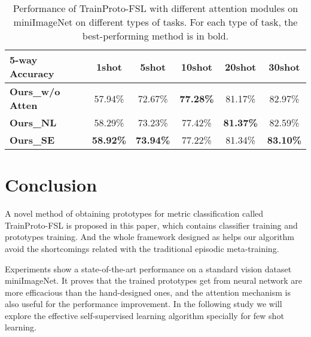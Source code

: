 \documentclass[conference]{IEEEtran}
\begin{document}
\begin{table}[htbp]
\caption{Performance of TrainProto-FSL with different attention modules on miniImageNet on different types of tasks. For each type of task, the best-performing method is in bold.}
\begin{center}
\begin{tabular}{l c c c c c}
\hline
\textbf{5-way Accuracy}&\textbf{1shot}&\textbf{5shot}&\textbf{10shot} &\textbf{20shot} &\textbf{30shot} \\
\hline
\textbf{Ours\_w/o Atten} &	57.94\%	&72.67\%	&\textbf{77.28\%}	&81.17\%	&82.97\% \\
\textbf{Ours\_NL}	&58.29\%	&73.23\%	&77.42\%	&\textbf{81.37\%}	&82.59\% \\
\textbf{Ours\_SE} &	\textbf{58.92\%}	&\textbf{73.94\%}	&77.22\%	&81.34\%	&\textbf{83.10\%} \\
\hline
\end{tabular}
\label{tab3}
\end{center}
\end{table}



\section{Conclusion}\label{Section 5}
A novel method of obtaining prototypes for metric classification called TrainProto-FSL is proposed in this paper, which contains classifier training and prototypes training. And the whole framework designed as \cite{li2020few} helps our algorithm avoid the shortcomings related with the traditional episodic meta-training.


Experiments show a state-of-the-art performance on a standard vision dataset miniImageNet. It proves that the trained prototypes get from neural network are more efficacious than the hand-designed ones, and the attention mechanism is also useful for the performance improvement. In the following study we will explore the effective self-supervised learning algorithm specially for few shot learning.











\vspace{12pt}
\end{document}
